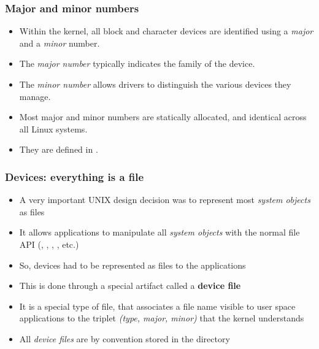 \begin{frame}
  \frametitle{Major and minor numbers}
  \begin{itemize}
  \item Within the kernel, all block and character devices are
    identified using a {\em major} and a {\em minor} number.
  \item The {\em major number} typically indicates the family of the
    device.
  \item The {\em minor number} allows drivers to distinguish
    the various devices they manage.
  \item Most major and minor numbers are statically allocated, and
    identical across all Linux systems.
  \item They are defined in .
  \end{itemize}
\end{frame}

\begin{frame}
  \frametitle{Devices: everything is a file}
  \begin{itemize}
  \item A very important UNIX design decision was to represent most
    {\em system objects} as files
  \item It allows applications to manipulate all {\em system objects} with
    the normal file API (, , ,
    , etc.)
  \item So, devices had to be represented as files to the applications
  \item This is done through a special artifact called a {\bf device
      file}
  \item It is a special type of file, that associates a file name
    visible to user space applications to the triplet {\em (type,
      major, minor)} that the kernel understands
  \item All {\em device files} are by convention stored in the
     directory
  \end{itemize}
\end{frame}

